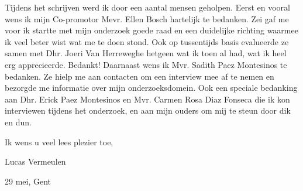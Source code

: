 Tijdens het schrijven werd ik door een aantal mensen geholpen. Eerst en vooral wens ik mijn Co-promotor Mevr. Ellen Bosch hartelijk te bedanken. Zei gaf me voor ik startte met mijn onderzoek goede raad en een duidelijke richting waarmee ik veel beter wist wat me te doen stond. Ook op tussentijds basis evalueerde ze samen met Dhr. Joeri Van Herreweghe hetgeen wat ik toen al had, wat ik heel erg apprecieerde. Bedankt! Daarnaast wens ik Mvr. Sadith Paez Montesinos te bedanken. Ze hielp me aan contacten om een interview mee af te nemen en bezorgde me informatie over mijn onderzoeksdomein. Ook een speciale bedanking aan Dhr. Erick Paez Montesinos en Mvr. Carmen Rosa Diaz Fonseca die ik kon interviewen tijdens het onderzoek, en aan mijn ouders om mij te steun door dik en dun.

Ik wens u veel lees plezier toe,

Lucas Vermeulen

29 mei, Gent